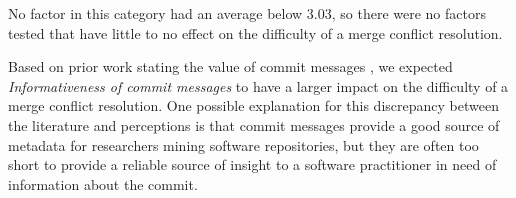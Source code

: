No factor in this category had an average below 3.03, so there were no factors tested that have little to no effect on the difficulty of a merge conflict resolution.

Based on prior work stating the value of commit messages \cite{yamauchi2014clustering} \cite{hindle2009automatic} \cite{cortes2014automatically} \cite{hattori2008nature}, we expected \textit{Informativeness of commit messages} to have a larger impact on the difficulty of a merge conflict resolution. One possible explanation for this discrepancy between the literature and perceptions is that commit messages provide a good source of metadata for researchers mining software repositories, but they are often too short to provide a reliable source of insight to a software practitioner in need of information about the commit.